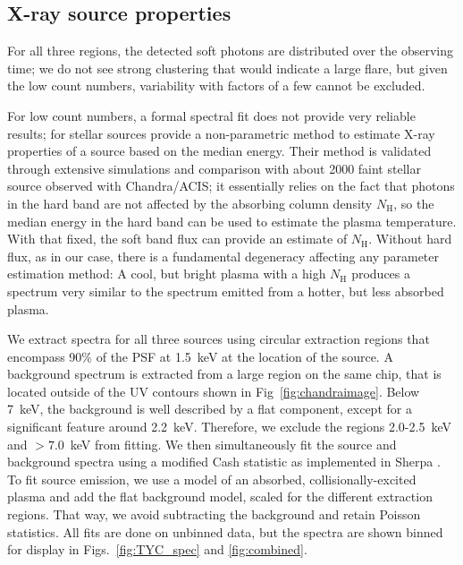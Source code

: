 \documentclass[]{aastex631}
\begin{document}
\subsection{X-ray source properties}
\label{sec:xrayspectra}
For all three regions, the detected soft photons are distributed over the observing time; we do not see strong clustering that would indicate a large flare, but given the low count numbers, variability with factors of a few cannot be excluded.

For low count numbers, a formal spectral fit does not provide very reliable results; for stellar sources \citet{2010ApJ...708.1760G} provide a non-parametric method to estimate X-ray properties of a source based on the median energy. Their method is validated through extensive simulations and comparison with about 2000 faint stellar source observed with Chandra/ACIS; it essentially relies on the fact that photons in the hard band are not affected by the absorbing column density $N_\mathrm{H}$, so the median energy in the hard band can be used to estimate the plasma temperature. With that fixed, the soft band flux can provide an estimate of $N_\mathrm{H}$. Without hard flux, as in our case, there is a fundamental degeneracy affecting any parameter estimation method: A cool, but bright plasma with a high $N_\mathrm{H}$ produces a spectrum very similar to the spectrum emitted from a hotter, but less absorbed plasma.

We extract spectra for all three sources using circular extraction regions that encompass 90\% of the PSF at 1.5~keV at the location of the source. A background spectrum is extracted from a large region on the same chip, that is located outside of the UV contours shown in Fig~\ref{fig:chandraimage}. Below 7~keV, the background is well described by a flat component, except for a significant feature around 2.2~keV. Therefore, we exclude the regions 2.0-2.5~keV and $>7.0$~keV from fitting. We then simultaneously fit the source and background spectra using a modified Cash statistic \citep{1979ApJ...228..939C} as implemented in Sherpa \citep{2007ASPC..376..543D,doug_burke_2021_4428938}. To fit source emission, we use a model of an absorbed, collisionally-excited plasma \citep[APEC model,][]{2012ApJ...756..128F} and add the flat background model, scaled for the different extraction regions. That way, we avoid subtracting the background and retain Poisson statistics. All fits are done on unbinned data, but the spectra are shown binned for display in Figs.~\ref{fig:TYC_spec} and \ref{fig:combined}.
\end{document}
